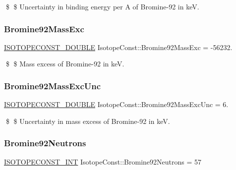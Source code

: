 \$ \$ Uncertainty in binding energy per A of Bromine-\/92 in keV. \mbox{\label{group___isotope_const-_bromine-_br92_ga15bdd6cf1afe22c6bf5709a069200bef}} 
\subsubsection{\texorpdfstring{Bromine92\+Mass\+Exc}{Bromine92MassExc}}
{\footnotesize\ttfamily \mbox{\hyperlink{group___isotope_const-_macros_ga8f45a7272ce02c0b4c65c44636ed719a}{I\+S\+O\+T\+O\+P\+E\+C\+O\+N\+S\+T\+\_\+\+D\+O\+U\+B\+LE}} Isotope\+Const\+::\+Bromine92\+Mass\+Exc = -\/56232.}

\$ \$ Mass excess of Bromine-\/92 in keV. \mbox{\label{group___isotope_const-_bromine-_br92_ga44b2789eccd4179b75122c2829ab8f43}} 
\subsubsection{\texorpdfstring{Bromine92\+Mass\+Exc\+Unc}{Bromine92MassExcUnc}}
{\footnotesize\ttfamily \mbox{\hyperlink{group___isotope_const-_macros_ga8f45a7272ce02c0b4c65c44636ed719a}{I\+S\+O\+T\+O\+P\+E\+C\+O\+N\+S\+T\+\_\+\+D\+O\+U\+B\+LE}} Isotope\+Const\+::\+Bromine92\+Mass\+Exc\+Unc = 6.}

\$ \$ Uncertainty in mass excess of Bromine-\/92 in keV. \mbox{\label{group___isotope_const-_bromine-_br92_ga543bb06e125ad852b490d8d15938c41c}} 
\subsubsection{\texorpdfstring{Bromine92\+Neutrons}{Bromine92Neutrons}}
{\footnotesize\ttfamily \mbox{\hyperlink{group___isotope_const-_macros_ga5f18360b3e99483a35c32d789e62621c}{I\+S\+O\+T\+O\+P\+E\+C\+O\+N\+S\+T\+\_\+\+I\+NT}} Isotope\+Const\+::\+Bromine92\+Neutrons = 57}


